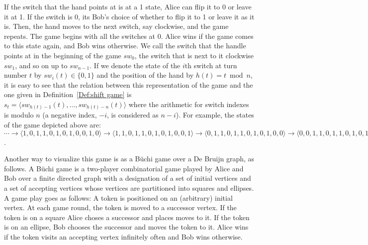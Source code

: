\documentclass[final,12pt]{elsarticle}
\theoremstyle{definition} \newtheorem{definition}[theorem]{Definition} \newtheorem{observation}[theorem]{Observation} \newtheorem{example}[theorem]{Example} \newtheorem{remark}[theorem]{Remark} \newtheorem{corrolary}[theorem]{Corrolary}
\newcommand{\T}[1]{\langle{#1}\rangle} \DeclareMathOperator{\drop}{drop} \DeclareMathOperator{\dropbits}{drop\_bits} \DeclareMathOperator{\dropstates}{drop\_states} \DeclareMathOperator{\leadingForm}{LeadingForm} \DeclareMathOperator{\dv}{div} %
\begin{document}
If the switch that the hand points at is at a 1 state, Alice can flip it to 0 or leave it at 1. If the switch is 0, its Bob's choice of whether to flip it to 1 or leave it as it is. Then, the hand moves to the next switch, say clockwise, and the game repeats. The game begins with all the switches at 0. Alice wins if the game comes to this state again, and Bob wins otherwise. We call the switch that the handle points at in the beginning of the game $sw_0$, the switch that is next to it clockwise $sw_1$, and so on up to $sw_{n-1}$. If we denote the state of the $i$th switch at turn number $t$ by $sw_i(t) \in \{0,1\}$ and the position of the hand by $h(t) = t \bmod n$, it is easy to see that the relation between this representation of the game and the one given in Definition~\ref{Def:shift game} is $s_t=\langle sw_{h(t)-1}(t), \dots, sw_{h(t)-n}(t) \rangle$ where the arithmetic for switch indexes is modulo $n$ (a negative index, $-i$, is considered as $n-i$). For example, the states of the game depicted above are:
$\cdots \to \T{1,0,1,1,0,1,0,1,0,0,1,0} \to \T{1,1,0,1,1,0,1,0,1,0,0,1} \to \T{0,1,1,0,1,1,0,1,0,1,0,0} \to \T{0,0,1,1,0,1,1,0,1,0,1,0} \to \cdots$.

Another way to visualize this game is as a B\"uchi game over a De Bruijn graph, as follows. A B\"uchi game is a two-player combinatorial game played by Alice and Bob over a finite directed graph with a designation of a set of initial vertices and a set of accepting vertices whose vertices are partitioned into squares and ellipses. A game play goes as follows: A token is positioned on an (arbitrary) initial vertex. At each game round, the token is moved to a successor vertex. If the token is on a square Alice choses a successor and places moves to it. If the token is on an ellipse, Bob chooses the successor and moves the token to it. Alice wins if the token visits an accepting vertex infinitely often and Bob wins otherwise.
\end{document}
